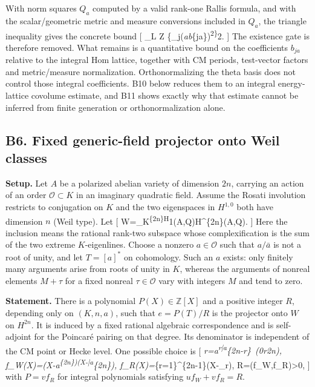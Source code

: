 \documentclass[11pt,a4paper]{article}
\theoremstyle{definition}
\begin{document}
With norm squares \(Q_a\) computed by a valid rank-one Rallis formula,
and with the scalar/geometric metric and measure conversions included in
\(Q_a\), the triangle inequality gives the concrete bound {[} \deg\_L
Z\leq{}
\left\{\sum\_j\left(\sum\emph{a\textbar b}\{ja\}\textbar{}\right)\textsuperscript{2\right\}}2.
{]} The existence gate is therefore removed. What remains is a
quantitative bound on the coefficients \(b_{ja}\) relative to the
integral Hom lattice, together with CM periods, test-vector factors and
metric/measure normalization. Orthonormalizing the theta basis does not
control those integral coefficients. B10 below reduces them to an
integral energy-lattice covolume estimate, and B11 shows exactly why
that estimate cannot be inferred from finite generation or
orthonormalization alone.

\subsection{B6. Fixed generic-field projector onto Weil
classes}\label{b6.-fixed-generic-field-projector-onto-weil-classes}

\textbf{Setup.} Let \(A\) be a polarized abelian variety of dimension
\(2n\), carrying an action of an order \(\mathcal O\subset K\) in an
imaginary quadratic field. Assume the Rosati involution restricts to
conjugation on \(K\) and the two eigenspaces in \(H^{1,0}\) both have
dimension \(n\) (Weil type). Let {[}
W=\bigwedge\_K\textsuperscript{\{2n\}H}1(A,\mathbb Q)\subset H\^{}\{2n\}(A,\mathbb Q).
{]} Here the inclusion means the rational rank-two subspace whose
complexification is the sum of the two extreme \(K\)-eigenlines. Choose
a nonzero \(a\in\mathcal O\) such that \(a/\bar a\) is not a root of
unity, and let \(T=[a]^*\) on cohomology. Such an \(a\) exists: only
finitely many arguments arise from roots of unity in \(K\), whereas the
arguments of nonreal elements \(M+\tau\) for a fixed nonreal
\(\tau\in\mathcal O\) vary with integers \(M\) and tend to zero.

\textbf{Statement.} There is a polynomial \(P(X)\in\mathbb Z[X]\) and a
positive integer \(R\), depending only on \((K,n,a)\), such that
\(e=P(T)/R\) is the projector onto \(W\) on \(H^{2n}\). It is induced by
a fixed rational algebraic correspondence and is self-adjoint for the
Poincaré pairing on that degree. Its denominator is independent of the
CM point or Hecke level. One possible choice is {[}
\lambda\emph{r=a\textsuperscript{r\bar a}\{2n-r\}~(0\leq r\leq2n),\quad
f\_W(X)=(X-a\textsuperscript{\{2n\})(X-\bar a}\{2n\}),\quad
f\_R(X)=\prod}\{r=1\}\^{}\{2n-1\}(X-\lambda\_r),\quad
R=(f\_W,f\_R)\textgreater0, {]} with \(P=vf_R\) for
integral polynomials satisfying \(u f_W+v f_R=R\).
\end{document}
